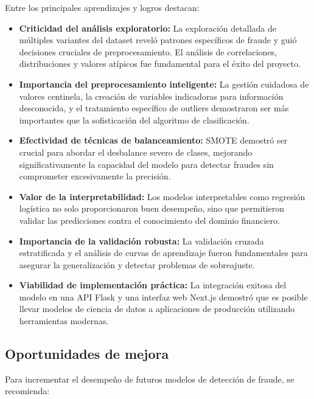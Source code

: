 \documentclass{llncs}
\begin{document}
Entre los principales aprendizajes y logros destacan:

\begin{itemize}
    \item \textbf{Criticidad del análisis exploratorio:} La exploración detallada de múltiples variantes del dataset reveló patrones específicos de fraude y guió decisiones cruciales de preprocesamiento. El análisis de correlaciones, distribuciones y valores atípicos fue fundamental para el éxito del proyecto.
    
    \item \textbf{Importancia del preprocesamiento inteligente:} La gestión cuidadosa de valores centinela, la creación de variables indicadoras para información desconocida, y el tratamiento específico de outliers demostraron ser más importantes que la sofisticación del algoritmo de clasificación.
    
    \item \textbf{Efectividad de técnicas de balanceamiento:} SMOTE demostró ser crucial para abordar el desbalance severo de clases, mejorando significativamente la capacidad del modelo para detectar fraudes sin comprometer excesivamente la precisión.
    
    \item \textbf{Valor de la interpretabilidad:} Los modelos interpretables como regresión logística no solo proporcionaron buen desempeño, sino que permitieron validar las predicciones contra el conocimiento del dominio financiero.
    
    \item \textbf{Importancia de la validación robusta:} La validación cruzada estratificada y el análisis de curvas de aprendizaje fueron fundamentales para asegurar la generalización y detectar problemas de sobreajuste.
    
    \item \textbf{Viabilidad de implementación práctica:} La integración exitosa del modelo en una API Flask y una interfaz web Next.js demostró que es posible llevar modelos de ciencia de datos a aplicaciones de producción utilizando herramientas modernas.
\end{itemize}

\subsection*{Oportunidades de mejora}

Para incrementar el desempeño de futuros modelos de detección de fraude, se recomienda:
\end{document}
